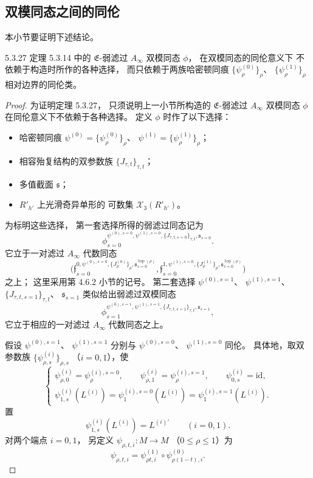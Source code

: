 
\subsection{双模同态之间的同伦}
\label{subsec:5-3-3}

本小节要证明下述结论。
\begin{theorem}{5.3.27}\label{thm:5-3-27}
定理 5.3.14 中的
$\mathfrak E$-弱滤过
$A_\infty$ 双模同态 $\phi$，
在双模同态的同伦意义下
不依赖于构造时所作的各种选择，
而只依赖于两族哈密顿同痕
$\{\psi^{(0)}_\rho\}_\rho$、
$\{\psi^{(1)}_\rho\}_\rho$
相对边界的同伦类。
\end{theorem}

\begin{proof}
为证明定理 5.3.27，
只须说明上一小节所构造的
$\mathfrak E$-弱滤过
$A_\infty$ 双模同态 $\phi$
在同伦意义下不依赖于各种选择。
定义 $\phi$ 时作了以下选择：
\begin{itemize}
\item 哈密顿同痕
$\psi^{(0)}=\{\psi^{(0)}_\rho\}_\rho$、
$\psi^{(1)}=\{\psi^{(1)}_\rho\}_\rho$；
\item 相容殆复结构的双参数族
$\{J_{\tau,t}\}_{\tau,t}$；
\item 多值截面 $\mathfrak s$；
\item $R'_{h'}$ 上光滑奇异单形的
可数集 $\mathcal X_3(R'_{h'})$。
\end{itemize}
为标明这些选择，
第一套选择所得的弱滤过同态记为
\[
\phi_{s=0}^{
\psi^{(0),s=0},\psi^{(1),s=0},
\{J_{\tau,t,s=0}\}_{\tau,t},
\mathfrak s_{s=0}}.
\]
它立于一对滤过 $A_\infty$ 代数同态
\[
\bigl(
\mathfrak f_{s=0}^{0,\psi^{(0),s=0},
\{J^{(0)}_\rho\}_\rho,
\mathfrak s_{s=0}^{\operatorname{top}(\rho)}},
\mathfrak f_{s=0}^{1,\psi^{(1),s=0},
\{J^{(1)}_\rho\}_\rho,
\mathfrak s_{s=0}^{\operatorname{top}(\rho)}}
\bigr)
\]
之上；
这里采用第 4.6.2 小节的记号。
第二套选择
$\psi^{(0),s=1}$、
$\psi^{(1),s=1}$、
$\{J_{\tau,t,s=1}\}_{\tau,t}$、
$\mathfrak s_{s=1}$
类似给出弱滤过双模同态
\[
\phi_{s=1}^{
\psi^{(0),s=1},\psi^{(1),s=1},
\{J_{\tau,t,s=1}\}_{\tau,t},
\mathfrak s_{s=1}},
\]
它立于相应的一对滤过
$A_\infty$ 代数同态之上。

假设
$\psi^{(0),s=1}$、
$\psi^{(1),s=1}$
分别与
$\psi^{(0),s=0}$、
$\psi^{(1),s=0}$
同伦。
具体地，取双参数族
$\{\psi^{(i)}_{\rho,s}\}_{\rho,s}$
（$i=0,1$），使
\[
\begin{cases}
\psi^{(i)}_{\rho,0}
 =\psi^{(i),s=0}_\rho,\qquad
\psi^{(i)}_{\rho,1}
 =\psi^{(i),s=1}_\rho,\qquad
\psi^{(i)}_{0,s}=\mathrm{id},\\
\psi^{(i)}_{1,s}(L^{(i)})
 =\psi^{(i),s=0}_1(L^{(i)})
 =\psi^{(i),s=1}_1(L^{(i)}).
\end{cases}
\]
置
\[
\psi^{(i)}_{1,s}(L^{(i)})
=L^{(i)\prime}
\qquad(i=0,1).
\]
对两个端点 $i=0,1$，
另定义
$\psi_{\rho,t,i}\colon M\to M$
（$0\le\rho\le1$）为
\[
\psi_{\rho,t,i}
=\psi^{(1)}_{\rho t,i}
\circ\psi^{(0)}_{\rho(1-t),i}.
\]


\end{proof}
